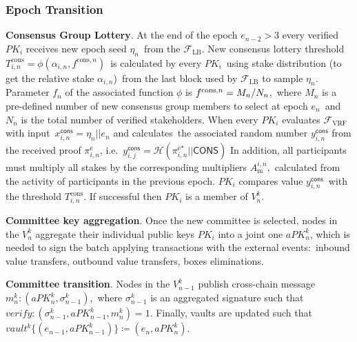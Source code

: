 \subsubsection{Epoch Transition}\label{subsubsec:epoch-transition}
\begin{legal}
    \item \textbf{Consensus Group Lottery}.
    At the end of the epoch ${e_{n-2} \gt 3}$ every verified $PK_i$ receives new epoch seed $\eta_n$\
    from the ${\mathcal{F}}_{\text{LB}}$.
    New consensus lottery threshold $T_{i, n}^{\text{cons}} = \phi(\alpha_{i, n}, f^{\text{cons}, n})$\
    is calculated by every $PK_i$\ using stake distribution (to get the relative stake $\alpha_{i, n}$)\
    from the last block used by ${\mathcal{F}}_{\text{LB}}$ to sample $\eta_n$.
    Parameter $f_n$ of the associated function $\phi$ is ${f^{\text{cons}, n} = M_n /\/ N_n}$,\
    where $M_n$ is a pre-defined number of new consensus group members to select at epoch $e_n$\
    and $N_n$ is the total number of verified stakeholders.
    When every $PK_i$ evaluates ${\mathcal{F}}_{\text{VRF}}$ with input\
    $x_{i, n}^{\textsf{cons}} = \eta_n || e_n $ and calculates\
    the associated random number $y_{i, n}^{\textsf{cons}}$ from the received proof $\pi_{i, n}^{\text{e}}$, i.e.\
    ${y_{i, j}^{\textsf{cons}} = \mathcal{H}(\pi_{i, n}^{\text{e}*}||\textsf{CONS})}$
    In addition, all participants must multiply all stakes by the corresponding multipliers $A^{i, n}_{\text{m}}$,\
    calculated from the activity of participants in the previous epoch.
    $PK_i$ compares value $y_{i, n}^{\textsf{cons}}$\
    with the threshold $T_{i, n}^{\text{cons}}$.
    If successful then $PK_i$ is a member of $V^k_n$.

    \item \textbf{Committee key aggregation}.
    Once the new committee is selected, nodes in the $V^k_n$ aggregate their individual public keys $PK_i$ into
    a joint one $aPK^k_n$, which is needed to sign the batch applying transactions with the external events:\
    inbound value transfers, outbound value transfers, boxes eliminations.

    \item \textbf{Committee transition}.
    Nodes in the $V^k_{n - 1}$ publish cross-chain message ${m^k_n : (aPK^k_n, \sigma^k_{n-1})}$,\
    where $\sigma^k_{n-1}$ is an aggregated signature such that ${verify: (\sigma^k_{n-1}, aPK^k_{n-1}, m^k_n) = 1}$.
    Finally, vaults are updated such that ${vault^k\{(e_{n-1}, aPK^k_{n-1})\} \coloneqq(e_n, aPK^k_n)}$.
\end{legal}

